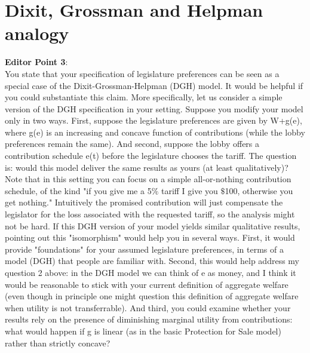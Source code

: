 \documentclass[12pt]{article}
\begin{document}
\section{Dixit, Grossman and Helpman analogy}
\textbf{Editor Point 3}: \\
You state that your specification of legislature preferences can be seen as a special case of the Dixit-Grossman-Helpman (DGH) model. It would be helpful if you could substantiate this claim. More specifically, let us consider a simple version of the DGH specification in your setting. Suppose you modify your model only in two ways. First, suppose the legislature preferences are given by W+g(e), where g(e) is an increasing and concave function of contributions (while the lobby preferences remain the same). And second, suppose the lobby offers a contribution schedule e(t) before the legislature chooses the tariff. The question is: would this model deliver the same results as yours (at least qualitatively)? Note that in this setting you can focus on a simple all-or-nothing contribution schedule, of the kind "if you give me a 5$\%$ tariff I give you $\$$100, otherwise you get nothing." Intuitively the promised contribution will just compensate the legislator for the loss associated with the requested tariff, so the analysis might not be hard.  If this DGH version of your model yields similar qualitative results, pointing out this "isomorphism" would help you in several ways. First, it would provide "foundations" for your assumed legislature preferences, in terms of a model (DGH) that people are familiar with. Second, this would help address my question 2 above: in the DGH model we can think of e as money, and I think it would be reasonable to stick with your current definition of aggregate welfare (even though in principle one might question this definition of aggregate welfare when utility is not transferrable). And third, you could examine whether your results rely on the presence of diminishing marginal utility from contributions: what would happen if g is linear (as in the basic Protection for Sale model) rather than strictly concave? \\
\end{document}
